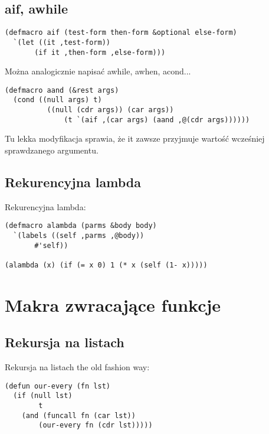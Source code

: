 \subsection{aif, awhile}
\begin{frame}[fragile]{}
\begin{verbatim}
(defmacro aif (test-form then-form &optional else-form)
  `(let ((it ,test-form))
       (if it ,then-form ,else-form)))
\end{verbatim}
\pause
Można analogicznie napisać awhile, awhen, acond...
\pause
\begin{verbatim}
(defmacro aand (&rest args)
  (cond ((null args) t)
          ((null (cdr args)) (car args))
	          (t `(aif ,(car args) (aand ,@(cdr args))))))
\end{verbatim}
\pause
Tu lekka modyfikacja sprawia, że it zawsze przyjmuje wartość wcześniej sprawdzanego argumentu.
\end{frame}

\subsection{Rekurencyjna lambda}
\begin{frame}[fragile]{}
Rekurencyjna lambda:
\begin{verbatim}
(defmacro alambda (parms &body body)
  `(labels ((self ,parms ,@body))
       #'self))

(alambda (x) (if (= x 0) 1 (* x (self (1- x)))))
\end{verbatim}
\end{frame}

\section{Makra zwracające funkcje}
\begin{frame}{}
\end{frame}

\subsection{Rekursja na listach}
\begin{frame}[fragile]{}
Rekursja na listach the old fashion way:
\begin{verbatim}
(defun our-every (fn lst)
  (if (null lst)
        t
	(and (funcall fn (car lst))
		(our-every fn (cdr lst)))))
\end{verbatim}
\end{frame}

